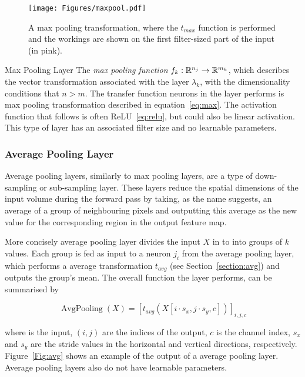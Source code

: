 \begin{figure}[ht!]
	\begin{center}
		\texttt{[image: Figures/maxpool.pdf]}
	\end{center}
	\caption{A max pooling transformation, where the $t_{max}$ function is performed and the workings are shown on the first filter-sized part of the input (in pink).}
	\label{Fig:maxpooling}
\end{figure} 


\begin{Definition}{Max Pooling Layer}{}
The \emph{max pooling function} $f_k:\mathbb{R}^{n_j}\to \mathbb{R}^{m_k}$, which describes the vector transformation associated with the layer $\lambda_k$, with the dimensionality conditions that $n > m$. The transfer function neurons in the layer performs is max pooling transformation described in equation~\eqref{eq:max}. The activation function that follows is often ReLU~\eqref{eq:relu}, but could also be linear activation. This type of layer has an associated filter size and no learnable parameters.
\end{Definition}

\subsubsection{Average Pooling Layer}
\label{section:avglayer}
Average pooling layers, similarly to max pooling layers, are a type of down-sampling or sub-sampling layer. These layers reduce the spatial dimensions of the input volume during the forward pass by taking, as the name suggests, an average of a group of neighbouring pixels and outputting this average as the new value for the corresponding region in the output feature map.

More concisely average pooling layer divides the input $X$ in to into groups of $k$ values. Each group is fed as input to a neuron $j_i$ from the average pooling layer, which performs a average transformation $t_{avg}$ (see Section~\ref{section:avg}) and outputs the group's mean. The overall function the layer performs, can be summarised by 

\begin{equation}
\operatorname{AvgPooling}(X)= [t_{avg}(X[i \cdot s_x, j \cdot s_y, c])]_{i,j,c}
\label{eq:averagepooling}
\end{equation}

where is the input, $(i,j)$ are the indices of the output, $c$ is the channel index, $s_x$ and $s_y$ are the stride values in the horizontal and vertical directions, respectively. Figure~\ref{Fig:avg} shows an example of the output of a average pooling layer. Average pooling layers also do not have learnable parameters.



